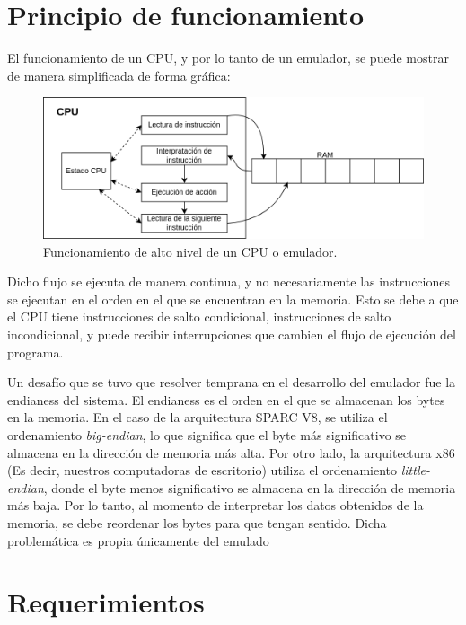 \section{Principio de funcionamiento}
\label{sec:principio_funcionamiento}

El funcionamiento de un CPU, y por lo tanto de un emulador, se puede mostrar de manera simplificada de forma gráfica:

\begin{figure}[htbp]
	\centering
	\includegraphics[width=1\textwidth]{./Figures/funcionamiento_emulador}
	\caption{Funcionamiento de alto nivel de un CPU o emulador.}
	\label{fig:functionamiento_emulador}
\end{figure}

Dicho flujo se ejecuta de manera continua, y no necesariamente las instrucciones se ejecutan en el orden en el que se encuentran en la memoria. Esto se debe a que el CPU tiene instrucciones de salto condicional, instrucciones de salto incondicional, y puede recibir interrupciones que cambien el flujo de ejecución del programa.


Un desafío que se tuvo que resolver temprana en el desarrollo del emulador fue la endianess del sistema. El endianess es el orden en el que se almacenan los bytes en la memoria. En el caso de la arquitectura SPARC V8, se utiliza el ordenamiento \textit{big-endian}, lo que significa que el byte más significativo se almacena en la dirección de memoria más alta. Por otro lado, la arquitectura x86 (Es decir, nuestros computadoras de escritorio) utiliza el ordenamiento \textit{little-endian}, donde el byte menos significativo se almacena en la dirección de memoria más baja. Por lo tanto, al momento de interpretar los datos obtenidos de la memoria, se debe reordenar los bytes para que tengan sentido. Dicha problemática es propia únicamente del emulado

\section{Requerimientos}
\label{sec:requerimientos}

